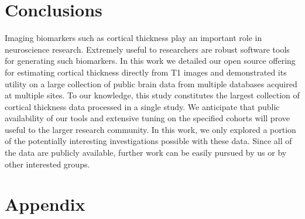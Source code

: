 \section{Conclusions}

Imaging biomarkers such as cortical thickness play an 
important role in neuroscience research.  Extremely useful to
researchers are robust software tools for generating such 
biomarkers.  In this work we detailed our open source offering for estimating
cortical thickness directly from T1 images and demonstrated
its utility on a large collection of public brain data from
multiple databases acquired at multiple sites.  To our knowledge,
this study constitutes the largest collection of cortical
thickness data processed in a single study.  
We anticipate that public availability of our tools and extensive tuning on
the specified cohorts will prove useful to the larger
research community.   In this work, we only explored a portion of the potentially
interesting investigations possible with these data.
Since all of the data are publicly available, further work can
be easily pursued by us or by other interested groups.


\section*{Appendix}

{}

